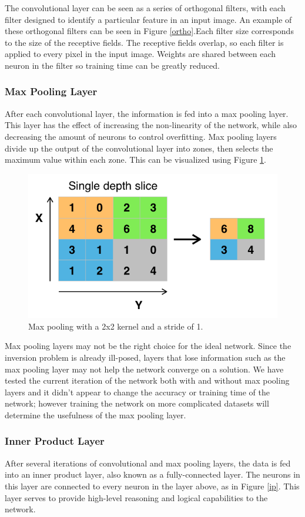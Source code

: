 \documentclass[twoside]{article}
\begin{document}
\begin{multicols}{2}
The convolutional layer can be seen as a series of orthogonal filters, with each filter designed to identify a particular feature in an input image. An example of these orthogonal filters can be seen in Figure \ref{ortho}.Each filter size corresponds to the size of the receptive fields. The receptive fields overlap, so each filter is applied to every pixel in the input image. Weights are shared between each neuron in the filter so training time can be greatly reduced.
\subsubsection{Max Pooling Layer}
After each convolutional layer, the information is fed into a max pooling layer. This layer has the effect of increasing the non-linearity of the network, while also decreasing the amount of neurons to control overfitting. Max pooling layers divide up the output of the convolutional layer into zones, then selects the maximum value within each zone. This can be visualized using Figure \ref{pooling}.
\begin{figure}[H]
	\includegraphics[width=\linewidth]{images/Max_pooling}
	\caption{Max pooling with a 2x2 kernel and a stride of 1.}
	\label{pooling}
\end{figure}
Max pooling layers may not be the right choice for the ideal network. Since the inversion problem is already ill-posed, layers that lose information such as the max pooling layer may not help the network converge on a solution. We have tested the current iteration of the  network both with and without max pooling layers and it didn't appear to change the accuracy or training time of the network; however training the network on more complicated datasets will determine the usefulness of the max pooling layer.
\subsubsection{Inner Product Layer}
After several iterations of convolutional and max pooling layers, the data is fed into an inner product layer, also known as a fully-connected layer. The neurons in this layer are connected to every neuron in the layer above, as in Figure \ref{ip}. This layer serves to provide high-level reasoning and logical capabilities to the network.

\end{multicols}
\end{document}
